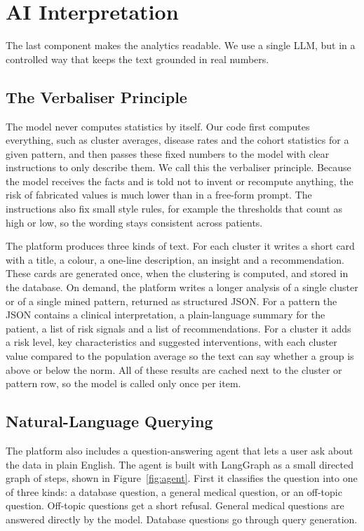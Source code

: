 
\section{AI Interpretation}
\label{sec:ai}

The last component makes the analytics readable. We use a single LLM, but in a controlled way that keeps the text grounded in real numbers.

\subsection{The Verbaliser Principle}

The model never computes statistics by itself. Our code first computes everything, such as cluster averages, disease rates and the cohort statistics for a given pattern, and then passes these fixed numbers to the model with clear instructions to only describe them. We call this the verbaliser principle. Because the model receives the facts and is told not to invent or recompute anything, the risk of fabricated values is much lower than in a free-form prompt. The instructions also fix small style rules, for example the thresholds that count as high or low, so the wording stays consistent across patients.

The platform produces three kinds of text. For each cluster it writes a short card with a title, a colour, a one-line description, an insight and a recommendation. These cards are generated once, when the clustering is computed, and stored in the database. On demand, the platform writes a longer analysis of a single cluster or of a single mined pattern, returned as structured JSON. For a pattern the JSON contains a clinical interpretation, a plain-language summary for the patient, a list of risk signals and a list of recommendations. For a cluster it adds a risk level, key characteristics and suggested interventions, with each cluster value compared to the population average so the text can say whether a group is above or below the norm. All of these results are cached next to the cluster or pattern row, so the model is called only once per item.

\subsection{Natural-Language Querying}

The platform also includes a question-answering agent that lets a user ask about the data in plain English. The agent is built with LangGraph as a small directed graph of steps, shown in Figure~\ref{fig:agent}. First it classifies the question into one of three kinds: a database question, a general medical question, or an off-topic question. Off-topic questions get a short refusal. General medical questions are answered directly by the model. Database questions go through query generation.

